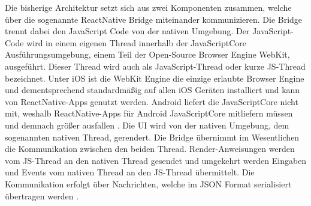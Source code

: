 Die bisherige Architektur setzt sich aus zwei Komponenten zusammen, welche über die sogenannte ReactNative Bridge miteinander kommunizieren.
Die Bridge trennt dabei den JavaScript Code von der nativen Umgebung.
Der JavaScript-Code wird in einem eigenen Thread innerhalb der JavaScriptCore Ausführungsumgebung, einem Teil der Open-Source Browser Engine WebKit, ausgeführt.
Dieser Thread wird auch als JavaScript-Thread oder kurze JS-Thread bezeichnet.
Unter iOS ist die WebKit Engine die einzige erlaubte Browser Engine und dementsprechend standardmäßig auf allen iOS Geräten installiert und kann von ReactNative-Apps genutzt werden.
Android liefert die JavaScriptCore nicht mit, weshalb ReactNative-Apps für Android JavaScriptCore mitliefern müssen und demnach größer ausfallen \cite{Dragomir_ReactNative,Nawrocki_Comparison_Hybrid_Native_Frameworks}.
Die \ac{UI} wird von der nativen Umgebung, dem sogenannten nativen Thread, gerendert.
Die Bridge übernimmt im Wesentlichen die Kommunikation zwischen den beiden Thread.
Render-Anweisungen werden vom JS-Thread an den nativen Thread gesendet und umgekehrt werden Eingaben und Events vom nativen Thread an den JS-Thread übermittelt.
Die Kommunikation erfolgt über Nachrichten, welche im \ac{JSON} Format serialisiert übertragen werden \cite{Dragomir_ReactNative}.






